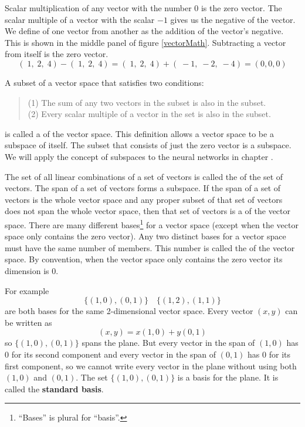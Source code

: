    Scalar multiplication of any vector with the number $0$ is the zero vector.
The scalar multiple of a vector with the scalar $-1$ gives us the negative
of the vector. We define  of one vector from 
another as the addition of the vector's negative. This is shown in the 
middle panel of figure \ref{vectorMath}. Subtracting a vector from itself is 
the zero vector.
\[
  (\; 1, \; 2, \; 4) - (\; 1, \; 2, \; 4) = 
  (\; 1, \; 2, \; 4) + (\; -1, \; -2, \; -4) = (0,0,0)
\]

   A subset of a vector space that satisfies two conditions:
\begin{quote}
(1) The sum of any two vectors in the subset is also in the subset.   \\
(2) Every scalar multiple of a vector in the set is also in the subset. 
\end{quote}
is called a  of the vector space. This definition allows a 
vector space to be a subspace of itself. The subset that consists of just the
zero vector is a subspace. We will apply the concept of subspaces to the 
neural networks in chapter . 

   The set of all linear combinations of a set of vectors is called the 
 of the set of vectors. The span of a set of vectors forms a 
subspace. If the span of a set of vectors is the whole vector space and any
proper subset of that set of vectors does not span the whole vector space, then 
that set of vectors is a  of the vector space. There are
many different bases\footnote{``Bases'' is plural for ``basis''.} for a vector 
space (except when the vector space only contains the zero vector). Any
two distinct bases for a vector space must have the same number of members. 
This number is called the  of the vector space. By
convention, when the vector space only contains the zero vector its dimension 
is $0$.

   For example
\[
\{ (1,0), (0,1) \} \quad \{ (1,2), (1,1) \}
\]
are both bases for the same 2-dimensional vector space. Every vector $(x,y)$
can be written as
\[
(x,y) = x(1,0)+y(0,1)
\]
so $\{ (1,0), (0,1) \}$ spans the plane. But every vector in the span of
$(1,0)$ has $0$ for its second component and every vector in the span of $(0,1)$
has $0$ for its first component, so we cannot write every vector in the plane 
without using both $(1,0)$ and $(0,1)$. The set $\{ (1,0), (0,1) \}$ is a basis for the plane. It is called the {\bf standard basis}. 

